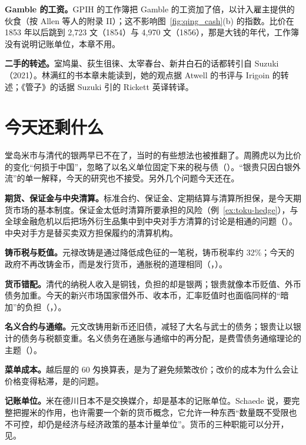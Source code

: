 \begin{deeper}[史料与几处不一致]
\textbf{Gamble 的工资。}GPIH 的工作簿把 Gamble 的工资加了倍，以计入雇主提供的伙食（按 Allen 等人的附录 II）\cite{allen2011china}；这不影响图~\ref{fig:qing_cash}(b) 的指数。比价在 1853 年以后跳到 2,723 文（1854）与 4,970 文（1856），那是大钱的年代，工作簿没有说明记账单位，本章不用。

\textbf{二手的转述。}室鸠巢、荻生徂徕、太宰春台、新井白石的话都转引自 Suzuki（2021）。林满红的书本章未能读到，她的观点据 Atwell 的书评与 Irigoin 的转述\cite{lin2006}；《管子》的话据 Suzuki 引的 Rickett 英译转译。
\end{deeper}

\section{今天还剩什么}\label{sec:toku-legacy}

堂岛米市与清代的银两早已不在了，当时的有些想法也被推翻了。周腾虎以为比价的变化“何损于中国”，忽略了以名义单位固定下来的税与债（）。“银贵只因白银外流”的单一解释，今天的研究也不接受。另外几个问题今天还在。

\textbf{期货、保证金与中央清算。}标准合约、保证金、定期结算与清算所担保，是今天期货市场的基本制度。保证金太低时清算所要承担的风险（例~\ref{ex:toku-hedge}），与全球金融危机以后把场外衍生品集中到中央对手方清算的讨论是相通的问题（）。中央对手方是替买卖双方担保履约的清算机构。

\textbf{铸币税与贬值。}元禄改铸是通过降低成色征的一笔税，铸币税率约 32\%；今天的政府不再改铸金币，而是发行货币，通胀税的道理相同（，）。

\textbf{货币错配。}清代的纳税人收入是铜钱，负担的却是银两；银贵就像本币贬值、外币债务加重。今天的新兴市场国家借外币、收本币，汇率贬值时也面临同样的“暗加”的负担（，）。

\textbf{名义合约与通缩。}元文改铸用新币还旧债，减轻了大名与武士的债务；银贵让以银计的债务与税额变重。名义债务在通胀与通缩中的再分配，是费雪债务通缩理论的主题（）。

\textbf{菜单成本。}越后屋的 60 匁换算表，是为了避免频繁改价；改价的成本为什么会让价格变得粘滞，是的问题。

\textbf{记账单位。}米在德川日本不是交换媒介，却是基本的记账单位。Schaede 说，要完整把握米的作用，也许需要一个新的货币概念，它允许一种东西“数量既不受限也不可控，却仍是经济与经济政策的基本计量单位”\cite{schaede1989}。货币的三种职能可以分开，见。

